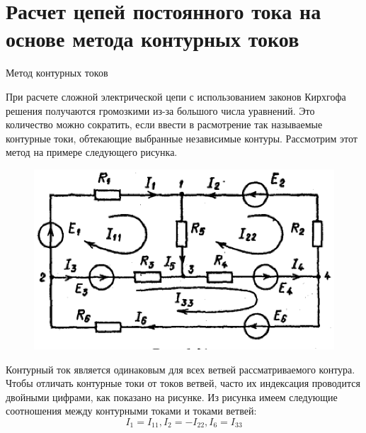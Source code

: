 \documentclass[10pt, pdf, hyperref={unicode},handout]{beamer}
\begin{document}
\section{Расчет цепей постоянного тока на основе метода контурных токов}
\begin{frame}{Метод контурных токов}
  \begin{block}

    \small{
      При расчете сложной электрической цепи с использованием законов Кирхгофа решения получаются громозкими из-за большого числа уравнений. Это количество можно сократить, если ввести в расмотрение так называемые контурные токи, обтекающие выбранные независимые контуры. Рассмотрим этот метод на примере следующего рисунка.
      \begin{figure}[htb] 
    \centering
    \includegraphics [scale=1.0]{ris18.eps}
  \end{figure}
}
Контурный ток является одинаковым для всех ветвей рассматриваемого контура. Чтобы отличать контурные токи от токов ветвей, часто их индексация проводится двойными цифрами, как показано на рисунке. Из рисунка имеем следующие соотношения между контурными токами и токами ветвей:
$$I_1=I_{11}, I_2=-I_{22}, I_6=I_{33}$$
  \end{block}
  
\end{frame}
\end{document}
